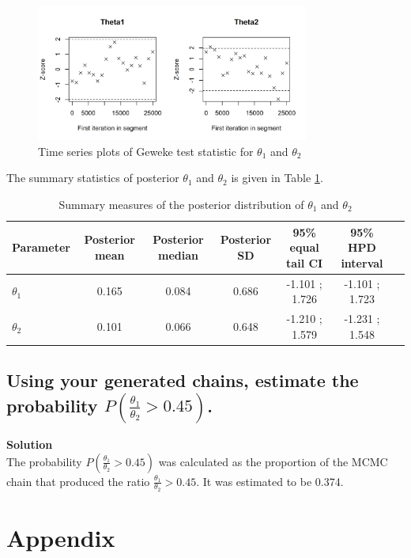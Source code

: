 \documentclass[12pt]{article}
\begin{document}
\begin{figure}[H]
    \centering    \includegraphics[width=0.8\textwidth]{pictures/fig05-mh-geweke.png}
    \caption{Time series plots of Geweke test statistic for \( \theta_1 \) and \( \theta_2 \)}
    \label{fig:mh-geweke}
\end{figure}

The summary statistics of posterior $\theta_1$ and $\theta_2$ is given in Table \ref{tbl:mh-summary}.

\begin{table}[H]
\centering
\begin{tabular}{lcccccc}
\hline
Parameter & Posterior mean & Posterior median & Posterior SD & 95\% equal tail CI & 95\% HPD interval \\
\hline
$\theta_1$ & 0.165 & 0.084 & 0.686 & -1.101 ; 1.726 & -1.101 ; 1.723 \\
$\theta_2$ & 0.101 & 0.066 & 0.648 & -1.210 ; 1.579 & -1.231 ; 1.548 \\
\hline
\end{tabular}
\caption{Summary measures of the posterior distribution of $\theta_1$ and $\theta_2$}
\label{tbl:mh-summary}
\end{table}

\subsection{Using your generated chains, estimate the probability \( P\left(\frac{\theta_1}{\theta_2} > 0.45\right) \).}
\textbf{Solution}\\
The probability \( P\left(\frac{\theta_1}{\theta_2} > 0.45\right) \) was calculated as the proportion of the MCMC chain that produced the ratio \( \frac{\theta_1}{\theta_2} > 0.45 \). It was estimated to be 0.374.

\printbibliography

\section{Appendix}
\end{document}
